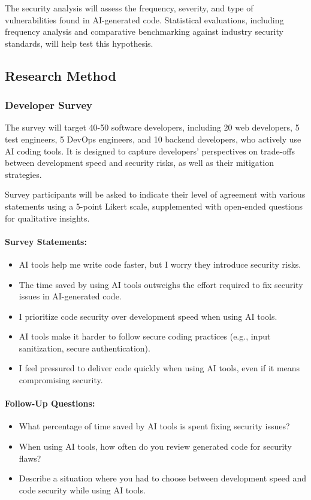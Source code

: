 The security analysis will assess the frequency, severity, and type of vulnerabilities found in AI-generated code. Statistical evaluations, including frequency analysis and comparative benchmarking against industry security standards, will help test this hypothesis.


\subsection{Research Method}

\subsubsection{Developer Survey}

The survey will target 40-50 software developers, including 20 web developers, 5 test engineers, 5 DevOps engineers, and 10 backend developers, who actively use AI coding tools. It is designed to capture developers' perspectives on trade-offs between development speed and security risks, as well as their mitigation strategies.

Survey participants will be asked to indicate their level of agreement with various statements using a 5-point Likert scale, supplemented with open-ended questions for qualitative insights.

\paragraph{Survey Statements:}
\begin{itemize}
    \item AI tools help me write code faster, but I worry they introduce security risks.
    \item The time saved by using AI tools outweighs the effort required to fix security issues in AI-generated code.
    \item I prioritize code security over development speed when using AI tools.
    \item AI tools make it harder to follow secure coding practices (e.g., input sanitization, secure authentication).
    \item I feel pressured to deliver code quickly when using AI tools, even if it means compromising security.
\end{itemize}

\paragraph{Follow-Up Questions:}
\begin{itemize}
    \item What percentage of time saved by AI tools is spent fixing security issues?
    \item When using AI tools, how often do you review generated code for security flaws?
    \item Describe a situation where you had to choose between development speed and code security while using AI tools.
\end{itemize}


